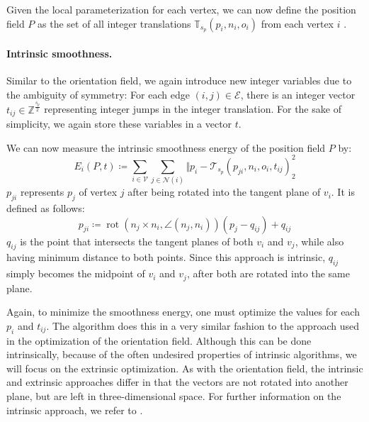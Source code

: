 \documentclass{ACGSeminar}
\DeclareMathOperator{\rot}{rot}
\begin{document}
Given the local parameterization for each vertex, we can now define the position field $P$ as the set of all integer translations $\mathbb{T}_{s_p}(p_i, n_i, o_i)$ from each vertex $i$ \cite{jakob2015instant}.

\paragraph{Intrinsic smoothness.}
Similar to the orientation field, we again introduce new integer variables due to the ambiguity of symmetry: For each edge $(i,j) \in \mathcal{E}$, there is an integer vector $t_{ij} \in \mathbb{Z}^{\frac{s_p}{2}}$ representing integer jumps in the integer translation. For the sake of simplicity, we again store these variables in a vector $t$.\bigskip

We can now measure the intrinsic smoothness energy of the position field $P$ by:
\begin{equation*}
	E_i(P,t) \coloneqq \sum_{i \in \mathcal{V}} \sum_{j \in \mathcal{N}(i)} \Vert p_i - \mathcal{T}_{s_p}(p_{ji}, n_i, o_i, t_{ij})^2_2
\end{equation*}
$p_{ji}$ represents $p_j$ of vertex $j$ after being rotated into the tangent plane of $v_i$. It is defined as follows:
\begin{equation*}
	p_{ji} \coloneqq \rot(n_j \times n_i, \angle(n_j, n_i)) (p_j - q_{ij}) + q_{ij}
\end{equation*}
$q_{ij}$ is the point that intersects the tangent planes of both $v_i$ and $v_j$, while also having minimum distance to both points. Since this approach is intrinsic, $q_{ij}$ simply becomes the midpoint of $v_i$ and $v_j$, after both are rotated into the same plane.\bigskip

Again, to minimize the smoothness energy, one must optimize the values for each $p_i$ and $t_{ij}$. The algorithm does this in a very similar fashion to the approach used in the optimization of the orientation field. Although this can be done intrinsically, because of the often undesired properties of intrinsic algorithms, we will focus on the extrinsic optimization. As with the orientation field, the intrinsic and extrinsic approaches differ in that the vectors are not rotated into another plane, but are left in three-dimensional space. For further information on the intrinsic approach, we refer to \cite{jakob2015instant}.
\end{document}

